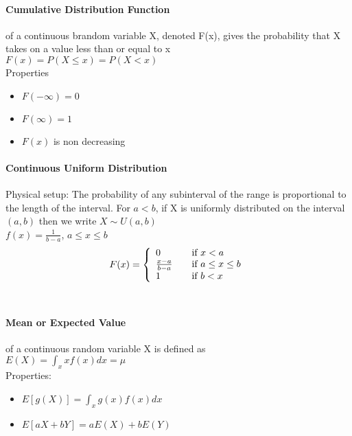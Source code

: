 \documentclass[12pt]{report}
\begin{document}
    \paragraph{Cumulative Distribution Function} of a continuous brandom
    variable X, denoted F(x), gives the probability that X takes on a value
    less than or equal to x\\
    $F(x) = P(X \leq x) = P(X < x)$\\
    Properties
    \begin{itemize}
      \item $F(-\infty) = 0$
      \item $F(\infty) = 1$
      \item $F(x)$ is non decreasing
    \end{itemize}

    \paragraph{Continuous Uniform Distribution}
      Physical setup: The probability of any subinterval of the range is
      proportional to the length of the interval. For $a < b$, if X is
      uniformly distributed on the interval $(a, b)$ then we write $X \sim U(a,
      b)$\\
      $f(x) = \frac{1}{b-a}$, $a \leq x \leq b$\\

      \[ F(x) = \left\{
        \begin{array}{l l}
          0               & \quad \text{if $x < a$}\\
          \frac{x-a}{b-a} & \quad \text{if $a \leq x \leq b$}\\
          1               & \quad \text{if $b < x$}
        \end{array}
        \right.  \]\\

    \paragraph{Mean or Expected Value} of a continuous random variable X is
    defined as\\
    $E(X) = \int_{x} xf(x) dx = \mu$\\
    Properties:
    \begin{itemize}
      \item $E[g(X)] = \int_x g(x)f(x)dx$
      \item $E[aX + bY] = aE(X) + bE(Y)$
    \end{itemize}
\end{document}

